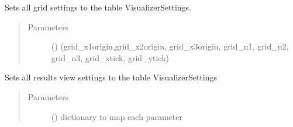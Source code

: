 \documentclass[letterpaper,10pt,english]{sphinxmanual}
\begin{document}
\begin{fulllineitems}
\begin{fulllineitems}
\end{fulllineitems}


\begin{fulllineitems}
\label{\detokenize{api:beamon.database.Database.set_grid_settings}}
Sets all grid settings to the table VisualizerSettings.
\begin{quote}\begin{description}
\item[{Parameters}] \leavevmode
{} () \textendash{} (grid\_x1origin,grid\_x2origin, grid\_x3origin, grid\_n1, grid\_n2, grid\_n3, grid\_xtick, grid\_ytick)

\end{description}\end{quote}

\end{fulllineitems}


\begin{fulllineitems}
\label{\detokenize{api:beamon.database.Database.set_results_view_settings}}
Sets all results view settings to the table VisualizerSettings
\begin{quote}\begin{description}
\item[{Parameters}] \leavevmode
{} () \textendash{} dictionary to map each parameter

\end{description}\end{quote}

\end{fulllineitems}



\end{fulllineitems}
\end{document}
